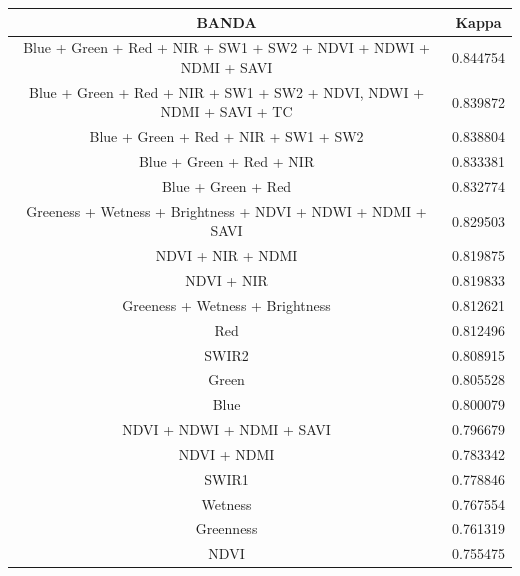 \begin{table}[h!]
\centering
{}
\footnotesize
\begin{tabular}{|c | c|}
\hline
                                                               BANDA &  Kappa \\
\hline
    Blue + Green + Red + NIR + SW1 + SW2 + NDVI + NDWI + NDMI + SAVI &  0.844754 \\
Blue + Green + Red + NIR + SW1 + SW2 + NDVI, NDWI + NDMI + SAVI + TC &  0.839872 \\
                                Blue + Green + Red + NIR + SW1 + SW2 &  0.838804 \\
                                            Blue + Green + Red + NIR &  0.833381 \\
                                                  Blue + Green + Red &  0.832774 \\
         Greeness + Wetness + Brightness + NDVI + NDWI + NDMI + SAVI &  0.829503 \\
                                                   NDVI + NIR + NDMI &  0.819875 \\
                                                          NDVI + NIR &  0.819833 \\
                                     Greeness + Wetness + Brightness &  0.812621 \\
                                                                 Red &  0.812496 \\
                                                               SWIR2 &  0.808915 \\
                                                              Green  &  0.805528 \\
                                                                Blue &  0.800079 \\
                                           NDVI + NDWI + NDMI + SAVI &  0.796679 \\
                                                         NDVI + NDMI &  0.783342 \\
                                                               SWIR1 &  0.778846 \\
                                                             Wetness &  0.767554 \\
                                                           Greenness &  0.761319 \\
                                                               NDVI  &  0.755475 \\

\end{tabular}
\end{table}
